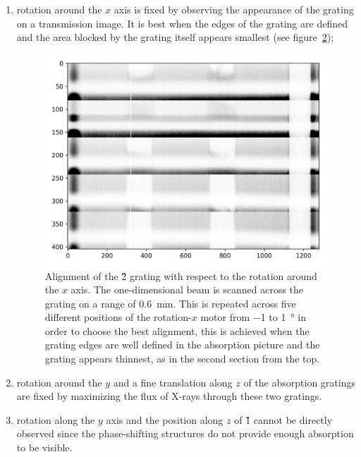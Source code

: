 \begin{enumerate}
\begin{figure}[htb]
            \label{fig:alignment-z}
        \end{figure}
    \item rotation around the $x$ axis is fixed by observing the appearance
        of the grating on a transmission image. It is best when the edges of
        the grating are defined and the area blocked by the grating itself
        appears smallest (see figure~\ref{fig:alignment-x});
        \begin{figure}[htb]
            \centering
            \includegraphics[width=\textwidth]{gfx/alignment-rot-x.png}
            \caption{Alignment of the \G2 grating with respect to the rotation
            around the $x$ axis. The one-dimensional beam is scanned across the
            grating on a range of \SI{0.6}{\milli\metre}. This is repeated across
            five different positions of the rotation-$x$ motor from \num{-1} to
            \SI{+1}{\degree} in order to choose the
            best alignment, this is achieved when the grating edges are well defined in
            the absorption picture and the grating appears thinnest, as in the second
        section from the top.}
            \label{fig:alignment-x}
        \end{figure}
    \item rotation around the $y$ and a fine translation along $z$ of the
        absorption gratings are fixed by maximizing the flux of X-rays
        through these two gratings.
    \item rotation along the $y$ axis and the position along $z$
        of \G{1} cannot be directly observed since the phase-shifting
        structures do not provide enough absorption to be visible.

\end{enumerate}
